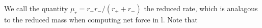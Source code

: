 We call the quantity \(\mu_r = r_+r_-/(r_+ + r_-)\) the reduced rate, which is analagous to the reduced mass when computing net force in l.  Note that